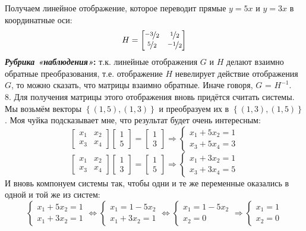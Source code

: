 \documentclass[a3paper,14pt]{extarticle}
\begin{document}
Получаем линейное отображение, которое переводит прямые $y = 5x$ и $y = 3x$ в координатные оси:
$$H = \begin{bmatrix}
    \nicefrac{-3}{2} & \nicefrac{1}{2} \\ \nicefrac{5}{2} & \nicefrac{-1}{2}
\end{bmatrix}$$
\textbf{\textit{Рубрика «наблюдения»}:} т.к. линейные отображения $G$ и $H$ делают взаимно обратные преобразования, т.е. отображение $H$ невелирует действие отображения $G$, то можно сказать, что матрицы взаимно обратные. Иначе говоря, $G$ = $H^{-1}$.\\[1.5em]
8. Для получения матрицы этого отображения вновь придётся считать системы. Мы возьмём векторы $\left\{(1, 5), (1, 3)\right\}$ и преобразуем их в $\left\{(1, 3), (1, 5)\right\}$. Моя чуйка подсказывает мне, что результат будет очень интересным:
$$\begin{bmatrix}
    x_1 & x_2 \\ x_3 & x_4
\end{bmatrix}\begin{bmatrix}
    1 \\ 5
\end{bmatrix} = \begin{bmatrix}
    1 \\ 3
\end{bmatrix} \Rightarrow \begin{cases}
    x_1 + 5x_2 = 1 \\ x_3 + 5x_4 = 3
\end{cases}$$
$$\begin{bmatrix}
    x_1 & x_2 \\ x_3 & x_4
\end{bmatrix}\begin{bmatrix}
    1 \\ 3
\end{bmatrix} = \begin{bmatrix}
    1 \\ 5
\end{bmatrix} \Rightarrow \begin{cases}
    x_1 + 3x_2 = 1 \\ x_3 + 3x_4 = 5
\end{cases}$$
И вновь компонуем системы так, чтобы одни и те же переменные оказались в одной и той же из систем:
$$\begin{cases}
    x_1 + 5x_2 = 1 \\ x_1 + 3x_2 = 1
\end{cases} \Leftrightarrow \begin{cases}
    x_1 = 1 - 5x_2 \\ x_1 + 3x_2 = 1
\end{cases} \Leftrightarrow \begin{cases}
    x_1 = 1 - 5x_2 \\ x_2 = 0
\end{cases} \Rightarrow \begin{cases}
    x_1 = 1 \\ x_2 = 0
\end{cases}$$
\end{document}
